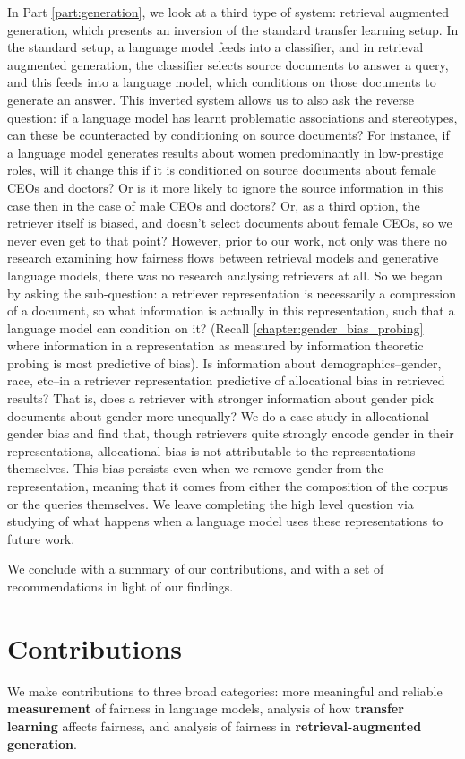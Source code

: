 In Part \ref{part:generation}, we look at a third type of system: retrieval augmented generation, which presents an inversion of the standard transfer learning setup. In the standard setup,  a language model feeds into a classifier, and in retrieval augmented generation, the classifier selects source documents to answer a query, and this feeds into a language model, which conditions on those documents to generate an answer. This inverted system allows us to also ask the reverse question: if a language model has learnt problematic associations and stereotypes, can these be counteracted by conditioning on source documents? For instance, if a language model generates results about women predominantly in low-prestige roles, will it change this if it is conditioned on source documents about female CEOs and doctors? Or is it more likely to ignore the source information in this case then in the case of male CEOs and doctors? Or, as a third option, the retriever itself is biased, and doesn't select documents about female CEOs, so we never even get to that point?
However, prior to our work, not only was there no research examining how fairness flows between retrieval models and generative language models, there was no research analysing retrievers at all. So we began by asking the sub-question: a retriever representation is necessarily a compression of a document, so what information is actually in this representation, such that 
 a language model can condition on it? (Recall \ref{chapter:gender_bias_probing} where information in a representation as measured by information theoretic probing is most predictive of bias). Is information about demographics--gender, race, etc--in a retriever representation predictive of allocational bias in retrieved results? That is, does a retriever with stronger information about gender pick documents about gender more unequally? We do a case study in allocational gender bias and find that, though retrievers quite strongly encode gender in their representations, allocational bias is not attributable to the representations themselves. This bias persists even when we remove gender from the representation, meaning that it comes from either the composition of the corpus or the queries themselves. We leave completing the high level question via studying of what happens when a language model uses these representations to future work. 

 We conclude with a summary of our contributions, and with a set of recommendations in light of our findings.

\section{Contributions}
We make contributions to three broad categories: more meaningful and reliable \textbf{measurement} of fairness in language models, analysis of how \textbf{transfer learning} affects fairness, and analysis of fairness in \textbf{retrieval-augmented generation}.

